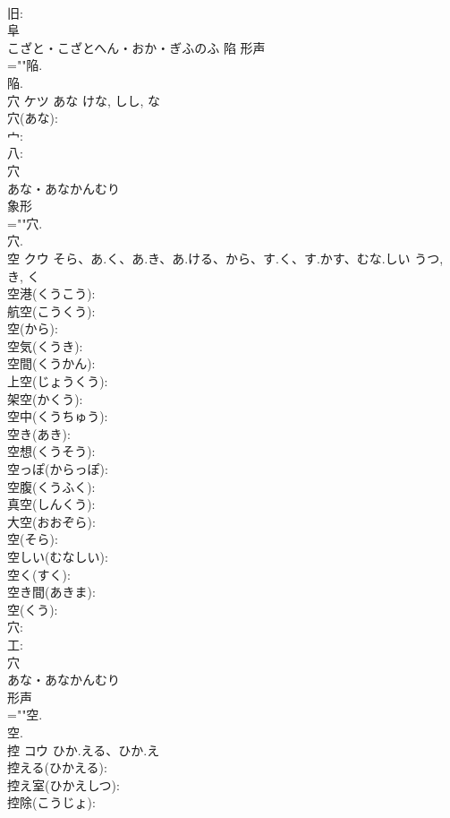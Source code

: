 \documentclass[8pt]{extreport}
\begin{document}
\begin{CJK}{UTF8}{min}
\\	旧: 
\\	阜	
\\	こざと・こざとへん・おか・ぎふのふ	陷	形声 
\\	=""陥.
\\	陥.
\\	穴	ケツ	あな	けな, しし, な	
\\	穴(あな): 
\\	宀: 
\\	八: 
\\	穴	
\\	あな・あなかんむり	
\\	象形 
\\	=""穴.
\\	穴.
\\	空	クウ	そら、あ.く、あ.き、あ.ける、から、す.く、す.かす、むな.しい	うつ, き, く	
\\	空港(くうこう): 
\\	航空(こうくう): 
\\	空(から): 
\\	空気(くうき): 
\\	空間(くうかん): 
\\	上空(じょうくう): 
\\	架空(かくう): 
\\	空中(くうちゅう): 
\\	空き(あき): 
\\	空想(くうそう): 
\\	空っぽ(からっぽ): 
\\	空腹(くうふく): 
\\	真空(しんくう): 
\\	大空(おおぞら): 
\\	空(そら): 
\\	空しい(むなしい): 
\\	空く(すく): 
\\	空き間(あきま): 
\\	空(くう): 
\\	穴: 
\\	工: 
\\	穴	
\\	あな・あなかんむり	
\\	形声 
\\	=""空.
\\	空.
\\	控	コウ	ひか.える、ひか.え		
\\	控える(ひかえる): 
\\	控え室(ひかえしつ): 
\\	控除(こうじょ): 

\end{CJK}
\end{document}

